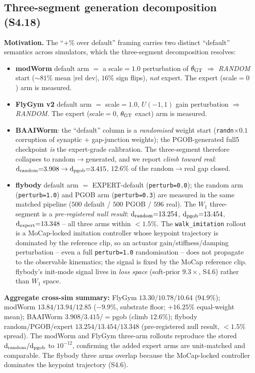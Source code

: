 \documentclass[11pt]{article}
\begin{document}
\subsection{Three-segment generation decomposition (S4.18)}
\label{si:three_segment}

\textbf{Motivation.} The ``$+\%$ over default'' framing carries two distinct ``default'' semantics across simulators, which the three-segment decomposition resolves:
\begin{itemize}\itemsep0pt
\item \textbf{modWorm} default arm $=$ a scale${=}1.0$ perturbation of $\theta_{\rm GT}$ $\Rightarrow$ \emph{RANDOM} start ($\sim 81\%$ mean $|$rel dev$|$, $16\%$ sign flips), \emph{not} expert. The expert (scale${=}0$) arm is measured.
\item \textbf{FlyGym v2} default arm $=$ scale${=}1.0$, $U(-1,1)$ gain perturbation $\Rightarrow$ \emph{RANDOM}. The expert (scale${=}0$, $\theta_{\rm GT}$ exact) arm is measured.
\item \textbf{BAAIWorm}: the ``default'' column is a \emph{randomised} weight start (\texttt{randn}$\times0.1$ corruption of synaptic + gap-junction weights); the PGOB-generated full5 checkpoint \emph{is} the expert-grade calibration. The three-segment therefore collapses to random$\to$generated, and we report \emph{climb toward real}: $\mathrm{d}_{\rm random}{=}3.908\to\mathrm{d}_{\rm pgob}{=}3.415$, $\mathbf{12.6\%}$ of the random$\to$real gap closed.
\item \textbf{flybody} default arm $=$ EXPERT-default (\texttt{perturb=0.0}); the random arm (\texttt{perturb=1.0}) and PGOB arm (\texttt{perturb=0.3}) are measured in the same matched pipeline ($500$ default / $500$ PGOB / $596$ real). The $W_1$ three-segment is a \emph{pre-registered null result}: $\mathrm{d}_{\rm random}{=}13.254$, $\mathrm{d}_{\rm pgob}{=}13.454$, $\mathrm{d}_{\rm expert}{=}13.348$ -- all three arms within $<1.5\%$. The \texttt{walk\_imitation} rollout is a MoCap-locked imitation controller whose keypoint trajectory is dominated by the reference clip, so an actuator gain/stiffness/damping perturbation -- even a full \texttt{perturb=1.0} randomisation -- does not propagate to the observable kinematics; the signal is fixed by the MoCap reference clip. flybody's init-mode signal lives in \emph{loss space} (soft-prior $9.3\times$, S4.6) rather than $W_1$ space.
\end{itemize}
\textbf{Aggregate cross-sim summary:} FlyGym $13.30/10.78/10.64$ ($\mathbf{94.9\%}$); modWorm $13.84/13.94/12.85$ ($\mathbf{-9.9\%}$, substrate floor; $+16.25\%$ equal-weight mean); BAAIWorm $3.908/3.415/{=}$pgob (climb $\mathbf{12.6\%}$); flybody random/PGOB/expert $13.254/13.454/13.348$ (pre-registered null result, $<1.5\%$ spread). The modWorm and FlyGym three-arm rollouts reproduce the stored $\mathrm{d}_{\rm random}/\mathrm{d}_{\rm pgob}$ to $10^{-12}$, confirming the added expert arms are unit-matched and comparable. The flybody three arms overlap because the MoCap-locked controller dominates the keypoint trajectory (S4.6).
\end{document}
